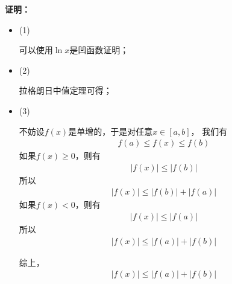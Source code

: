 \documentclass{article}
\begin{document}
\textbf{证明：}
\begin{itemize}
    \item (1)

          可以使用$\ln x$是凹函数证明；

    \item (2)

          拉格朗日中值定理可得；

    \item (3)

          不妨设$f(x)$是单增的，于是对任意$x \in [a, b]$，
          我们有
          \begin{align*}
              f(a) \leq f(x) \leq f(b)
          \end{align*}
          如果$f(x) \geq 0$，则有
          \begin{align*}
              |f(x)| \leq |f(b)|
          \end{align*}
          所以
          \begin{align*}
              |f(x)| \leq |f(b)| + |f(a)|
          \end{align*}
          如果$f(x) < 0$，则有
          \begin{align*}
              |f(x)| \leq |f(a)|
          \end{align*}
          所以
          \begin{align*}
              |f(x)| \leq |f(a)| + |f(b)|
          \end{align*}

          综上，
          \begin{align*}
              |f(x)| \leq |f(a)| + |f(b)|
          \end{align*}
\end{itemize}
\end{document}
